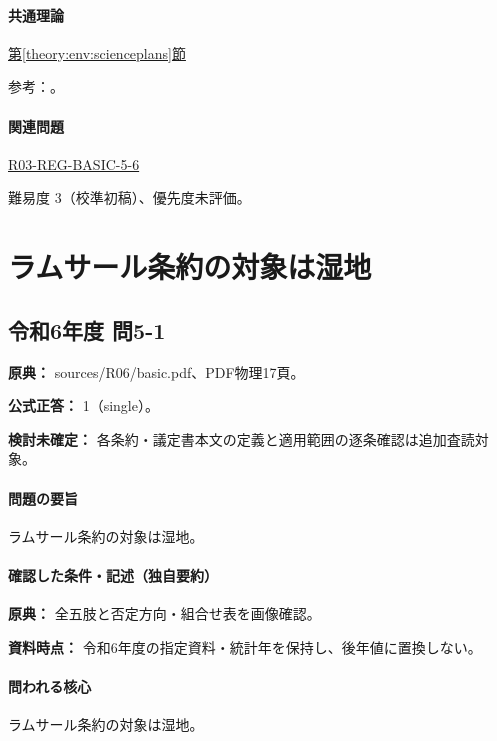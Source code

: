 \paragraph{共通理論} \hyperref[theory:env:scienceplans]{第\ref*{theory:env:scienceplans}節}

\par 参考：\cite{env60_plan2,env60_plan3}。

\paragraph{関連問題} \hyperref[q:r03-reg-basic-5-6]{R03-REG-BASIC-5-6}

\par 難易度 3（校準初稿）、優先度未評価。

\section{ラムサール条約の対象は湿地}

\subsection{令和6年度 問5-1}
\label{q:r06-reg-basic-5-1}

\noindent\textbf{原典：} sources/R06/basic.pdf、PDF物理17頁。

\textbf{公式正答：} 1（single）。

\par\textbf{検討未確定：} 各条約・議定書本文の定義と適用範囲の逐条確認は追加査読対象。

\paragraph{問題の要旨} ラムサール条約の対象は湿地。

\paragraph{確認した条件・記述（独自要約）}\mbox{}\par

\noindent\textbf{原典：} 全五肢と否定方向・組合せ表を画像確認。\par

\noindent\textbf{資料時点：} 令和6年度の指定資料・統計年を保持し、後年値に置換しない。\par

\paragraph{問われる核心} ラムサール条約の対象は湿地。

